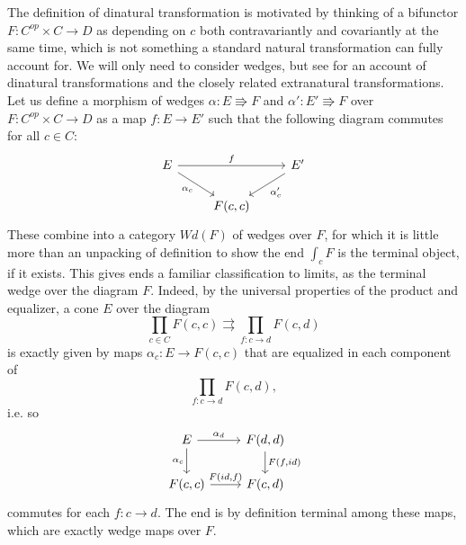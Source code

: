 The definition of dinatural transformation is motivated by thinking of a bifunctor $F:C^{op}\times C\rightarrow D$ as depending on $c$ both contravariantly and covariantly at the same time, which is not something a standard natural transformation can fully account for. We will only need to consider wedges, but see \cite{Loregian21} for an account of dinatural transformations and the closely related extranatural transformations. Let us define a morphism of wedges $\alpha:E\Rrightarrow F$ and $\alpha':E'\Rrightarrow F$ over $F:C^{op}\times C\rightarrow D$ as a map $f:E\rightarrow E'$ such that the following diagram commutes for all $c\in C$:
\[\begin{tikzcd}
E \arrow[rd, "\alpha_c"'] \arrow[rr, "f"] &          & E' \arrow[ld, "\alpha'_c"] \\
                                          & {F(c,c)} &                           
\end{tikzcd}\]
These combine into a category $Wd(F)$ of wedges over $F$, for which it is little more than an unpacking of definition to show the end $\int_c F$ is the terminal object, if it exists. This gives ends a familiar classification to limits, as the terminal wedge over the diagram $F$. Indeed, by the universal properties of the product and equalizer, a cone $E$ over the diagram $$\prod_{c\in C}F(c,c)\rightrightarrows \prod_{f:c\rightarrow d} F(c,d)$$ is exactly given by maps $\alpha_c:E\rightarrow F(c,c)$ that are equalized in each component of $$\prod_{f:c\rightarrow d} F(c,d),$$ i.e. so
\[\begin{tikzcd}
E \arrow[d, "\alpha_c"'] \arrow[r, "\alpha_d"] & {F(d,d)} \arrow[d, "{F(f,id)}"] \\
{F(c,c)} \arrow[r, "{F(id,f)}"]                & {F(c,d)}                       
\end{tikzcd}\]
commutes for each $f:c\rightarrow d$. The end is by definition terminal among these maps, which are exactly wedge maps over $F.$

